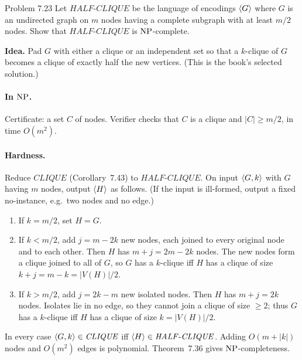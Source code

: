 \begin{question}{Problem 7.23}
Let $\mathit{HALF\text{-}CLIQUE}$ be the language of encodings $\langle G\rangle$ where $G$ is an undirected graph on $m$ nodes having a complete subgraph with at least $m/2$ nodes. Show that $\mathit{HALF\text{-}CLIQUE}$ is $\mathrm{NP}$-complete.
\end{question}
\begin{soln}
\textbf{Idea.} Pad $G$ with either a clique or an independent set so that a $k$-clique of $G$ becomes a clique of exactly half the new vertices. (This is the book's selected solution.)

\paragraph{In $\mathrm{NP}$.}
Certificate: a set $C$ of nodes. Verifier checks that $C$ is a clique and $|C|\ge m/2$, in time $O(m^2)$.

\paragraph{Hardness.}
Reduce $\mathit{CLIQUE}$ (Corollary~7.43) to $\mathit{HALF\text{-}CLIQUE}$. On input $\langle G,k\rangle$ with $G$ having $m$ nodes, output $\langle H\rangle$ as follows. (If the input is ill-formed, output a fixed no-instance, e.g.\ two nodes and no edge.)

\begin{enumerate}
\item If $k=m/2$, set $H=G$.
\item If $k<m/2$, add $j=m-2k$ new nodes, each joined to every original node and to each other. Then $H$ has $m+j=2m-2k$ nodes. The new nodes form a clique joined to all of $G$, so $G$ has a $k$-clique iff $H$ has a clique of size $k+j=m-k=|V(H)|/2$.
\item If $k>m/2$, add $j=2k-m$ new isolated nodes. Then $H$ has $m+j=2k$ nodes. Isolates lie in no edge, so they cannot join a clique of size $\ge 2$; thus $G$ has a $k$-clique iff $H$ has a clique of size $k=|V(H)|/2$.
\end{enumerate}

In every case $\langle G,k\rangle\in\mathit{CLIQUE}$ iff $\langle H\rangle\in\mathit{HALF\text{-}CLIQUE}$. Adding $O(m+|k|)$ nodes and $O(m^2)$ edges is polynomial. Theorem~7.36 gives $\mathrm{NP}$-completeness.
\end{soln}

